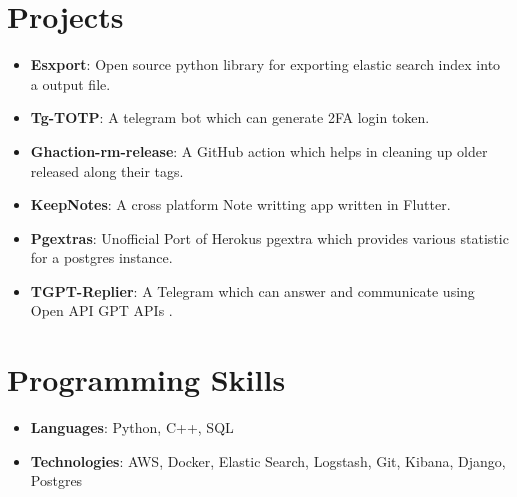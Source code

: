 \documentclass[letterpaper,11pt]{article}
\newcommand{\resumeItem}[2]{
  \item\small{
    \textbf{#1}{: #2 \vspace{-2pt}}
  }
}
\newcommand{\resumeSubItem}[2]{\resumeItem{#1}{#2}\vspace{-4pt}}
\newcommand{\resumeSubHeadingListStart}{\begin{itemize}[leftmargin=*]}
\newcommand{\resumeSubHeadingListEnd}{\end{itemize}}
\begin{document}
\section{Projects}
  \resumeSubHeadingListStart
    \resumeSubItem{Esxport}
      {Open source python library for exporting elastic search index into a output file.}
    \resumeSubItem{Tg-TOTP}
      {A telegram bot which can generate 2FA login token.}
    \resumeSubItem{Ghaction-rm-release}
      {A GitHub action which helps in cleaning up older released along their tags.}
    \resumeSubItem{KeepNotes}
      {A cross platform Note writting app written in Flutter.}
    \resumeSubItem{Pgextras}
      {Unofficial Port of Herokus pgextra which provides various statistic for a postgres instance.}
    \resumeSubItem{TGPT-Replier}
      {A Telegram which can answer and communicate using Open API GPT APIs .}
  \resumeSubHeadingListEnd

\section{Programming Skills}
 \resumeSubHeadingListStart
   \item{
     \textbf{Languages}{: Python, C++, SQL} \vspace{-5pt}
   }
   \item{
     \textbf{Technologies}{: AWS, Docker, Elastic Search, Logstash, Git, Kibana, Django, Postgres}
   }
 \resumeSubHeadingListEnd

\end{document}
